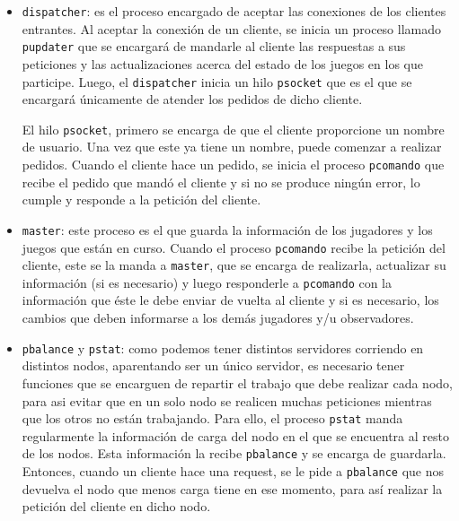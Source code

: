 \documentclass[11pt]{article}
\begin{document}
\begin{itemize}
    \item \texttt{dispatcher}: es el proceso encargado de aceptar las conexiones de los clientes
          entrantes. Al aceptar la conexión de un cliente, se inicia un proceso llamado
          \texttt{pupdater} que se encargará de mandarle al cliente las respuestas a sus peticiones y
          las actualizaciones acerca del
          estado de los juegos en los que participe. Luego, el \texttt{dispatcher} inicia
          un hilo \texttt{psocket} que es el que se encargará únicamente de atender los pedidos de dicho
          cliente.

          \hspace{0.5cm} El hilo \texttt{psocket}, primero se encarga de que el cliente proporcione un 
          nombre de usuario. Una vez que este ya tiene un nombre, puede comenzar a realizar
          pedidos. Cuando el cliente hace un pedido, se inicia el proceso \texttt{pcomando}
          que recibe el pedido que mandó el cliente y si no se produce ningún error, lo cumple
          y responde a la petición del cliente. 
    \item \texttt{master}: este proceso es el que guarda la información de los jugadores y 
          los juegos que están en curso. Cuando el proceso \texttt{pcomando} recibe la
          petición del cliente, este se la manda a \texttt{master}, que se encarga de 
          realizarla, actualizar su información (si es necesario) y luego responderle a \texttt{pcomando} con la información que éste
          le debe enviar de vuelta al cliente y si es necesario, los cambios
          que deben informarse a los demás jugadores y/u observadores.
    \item \texttt{pbalance} y \texttt{pstat}: como podemos tener distintos servidores corriendo
          en distintos nodos, aparentando ser un único servidor, es necesario tener funciones
          que se encarguen de repartir el trabajo que debe realizar cada nodo, para asi evitar 
          que en un solo nodo se realicen muchas peticiones mientras que los otros no están trabajando.
          Para ello, el proceso \texttt{pstat} manda regularmente la información de carga del nodo en el que
          se encuentra al resto de los nodos. Esta información la recibe \texttt{pbalance} y se encarga de
          guardarla. Entonces, cuando un cliente hace una request, se le pide a \texttt{pbalance} que
          nos devuelva el nodo que menos carga tiene en ese momento, para así realizar la petición del 
          cliente en dicho nodo. 
\end{itemize}
\end{document}
